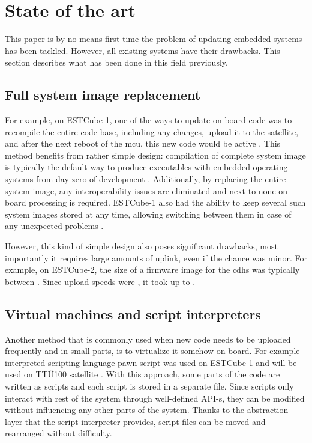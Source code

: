 \newpage
\section{State of the art}

This paper is by no means first time the problem of updating embedded systems has been tackled. However, all existing systems have their drawbacks. This section describes what has been done in this field previously.

\subsection{Full system image replacement}

For example, on ESTCube-1, one of the ways to update on-board code was to recompile the entire code-base, including any changes, upload it to the satellite, and after the next reboot of the \gls{mcu}, this new code would be active \cite{Suenter2016}. This method benefits from rather simple design: compilation of complete system image is typically the default way to produce executables with embedded operating systems from day zero of development . Additionally, by replacing the entire system image, any interoperability issues are eliminated and next to none on-board processing is required. ESTCube-1 also had the ability to keep several such system images stored at any time, allowing switching between them in case of any unexpected problems \cite{Tarbe2013}. 

However, this kind of simple design also poses significant drawbacks, most importantly it requires large amounts of uplink, even if the chance was minor. For example, on ESTCube-2, the size of a firmware image for the \gls{cdhs} was typically between . Since upload speeds were , it took up to . 

\subsection{Virtual machines and script interpreters}

Another method that is commonly used when new code needs to be uploaded frequently and in small parts, is to virtualize it somehow on board. For example interpreted scripting language pawn script was used on ESTCube-1 \cite{Suenter2016} and will be used on TTÜ100 satellite \cite{Aasavaeli2017}. With this approach, some parts of the code are written as scripts and each script is stored in a separate file. Since scripts only interact with rest of the system through well-defined API-s, they can be modified without influencing any other parts of the system. Thanks to the abstraction layer that the script interpreter provides, script files can be moved and rearranged without difficulty. 

